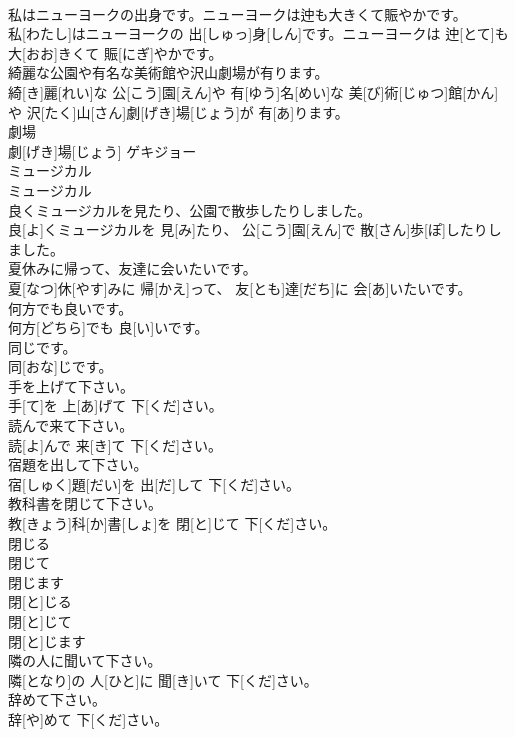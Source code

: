 \documentclass[8pt]{extreport}
\begin{document}
\begin{CJK}{UTF8}{min}
\\	私はニューヨークの出身です。ニューヨークは迚も大きくて賑やかです。	
\\	私[わたし]はニューヨークの 出[しゅっ]身[しん]です。ニューヨークは 迚[とて]も 大[おお]きくて 賑[にぎ]やかです。
\\	綺麗な公園や有名な美術館や沢山劇場が有ります。	
\\	綺[き]麗[れい]な 公[こう]園[えん]や 有[ゆう]名[めい]な 美[び]術[じゅつ]館[かん]や 沢[たく]山[さん]劇[げき]場[じょう]が 有[あ]ります。
\\	劇場	
\\	劇[げき]場[じょう]	ゲキジョー
\\	ミュージカル	
\\	ミュージカル
\\	良くミュージカルを見たり、公園で散歩したりしました。	
\\	良[よ]くミュージカルを 見[み]たり、 公[こう]園[えん]で 散[さん]歩[ぽ]したりしました。
\\	夏休みに帰って、友達に会いたいです。	
\\	夏[なつ]休[やす]みに 帰[かえ]って、 友[とも]達[だち]に 会[あ]いたいです。
\\	何方でも良いです。	
\\	何方[どちら]でも 良[い]いです。
\\	同じです。	
\\	同[おな]じです。
\\	手を上げて下さい。	
\\	手[て]を 上[あ]げて 下[くだ]さい。
\\	読んで来て下さい。	
\\	読[よ]んで 来[き]て 下[くだ]さい。
\\	宿題を出して下さい。	
\\	宿[しゅく]題[だい]を 出[だ]して 下[くだ]さい。
\\	教科書を閉じて下さい。	
\\	教[きょう]科[か]書[しょ]を 閉[と]じて 下[くだ]さい。
\\	閉じる 
\\	閉じて 
\\	閉じます	
\\	閉[と]じる 
\\	閉[と]じて 
\\	閉[と]じます
\\	隣の人に聞いて下さい。	
\\	隣[となり]の 人[ひと]に 聞[き]いて 下[くだ]さい。
\\	辞めて下さい。	
\\	辞[や]めて 下[くだ]さい。

\end{CJK}
\end{document}

